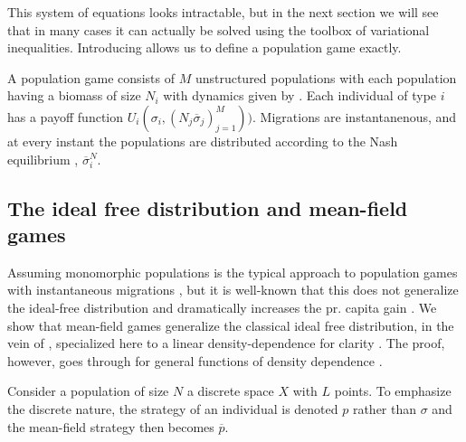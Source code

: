 This system of equations looks intractable, but in the next section we will see that in many cases it can actually be solved using the toolbox of variational inequalities. Introducing  allows us to define a population game exactly.
\begin{definition}\label{def:pop_game}
  A population game consists of $M$ unstructured populations with each population having a biomass of size $N_i$ with dynamics given by . Each individual of type $i$ has a payoff function $U_i(\sigma_i,  (N_j \overbar{\sigma}_j)_{j=1}^M))$. Migrations are instantanenous, and at every instant the populations are distributed according to the Nash equilibrium , $\overbar{\sigma}_i^N$.
\end{definition}
\subsection{The ideal free distribution and mean-field games}
Assuming monomorphic populations is the typical approach to population games with instantaneous migrations  \citep{kvrivan2013behavioral, vincent2005evolutionary}, but it is well-known that this does not generalize the ideal-free distribution and dramatically increases the pr. capita gain \citep{kvrivan2008ideal}. We show that mean-field games generalize the classical ideal free distribution, in the vein of \citep{cressman2010ideal}, specialized here to a linear density-dependence for clarity \cite{cressman2004ideal}. The proof, however, goes through for general functions of density dependence \citep{fretwell1969territorial}.


\begin{comment}
\begin{definition}
  In a monomorphic game the populations are assumed monomorphic. That is, for any individual of type $j$, we have $\sigma_j = \overbar{\sigma}_j$. Hence, an individual of type $i$ seeks to find $\sigma_i^*$ as:
  \begin{equation}
    \label{eq:ind_opt}
    \sigma^*_i = \argmax_{\sigma_i \in P_{\mu}} U_i(\sigma_i, (N_j, (\sigma}_j)_{j=1}^M)
  \end{equation}
\end{definition}
With the precise definition of a monomorphic game nailed down, we can show the claimed result:
\end{comment}
Consider a population of size $N$ a discrete space $X$ with $L$ points. To emphasize the discrete nature, the strategy of an individual is denoted $p$ rather than $\sigma$ and the mean-field strategy then becomes $\overbar{p}$.

